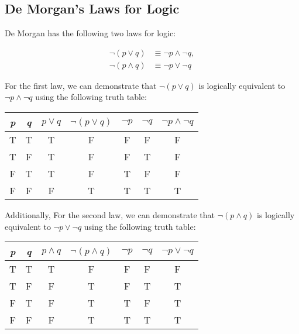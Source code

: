 \subsection*{De Morgan's Laws for Logic}

De Morgan has the following two laws for logic:

\begin{align*}
    \lnot (p \vee q) &\equiv \lnot p \land \lnot q,\\
    \lnot (p \land q) &\equiv \lnot p \vee \lnot q
\end{align*}

\clearpage

For the first law, we can demonstrate that $\lnot (p \vee q)$ is logically equivalent to $\lnot p \land \lnot q$ using the following truth table:

\begin{table}[h]
\centering
\begin{tabular}{|c|c|c|c|c|c|c|}
\hline
\textit{p} & \textit{q} & $p \vee q$ & $\lnot (p \vee q)$ & $\lnot p$ & $\lnot q$ & $\lnot p \land \lnot q$ \\ \hline
T & T & T & F & F & F & F \\ \hline
T & F & T & F & F & T & F \\ \hline
F & T & T & F & T & F & F \\ \hline
F & F & F & T & T & T & T \\ \hline
\end{tabular}
\end{table}

Additionally, For the second law, we can demonstrate that $\lnot (p \land q)$ is logically equivalent to $\lnot p \vee \lnot q$ using the following truth table:

\begin{table}[h]
\centering
\begin{tabular}{|c|c|c|c|c|c|c|}
\hline
\textit{p} & \textit{q} & $p \land q$ & $\lnot (p \land q)$ & $\lnot p$ & $\lnot q$ & $\lnot p \vee \lnot q$ \\ \hline
T & T & T & F & F & F & F \\ \hline
T & F & F & T & F & T & T \\ \hline
F & T & F & T & T & F & T \\ \hline
F & F & F & T & T & T & T \\ \hline
\end{tabular}
\end{table}

